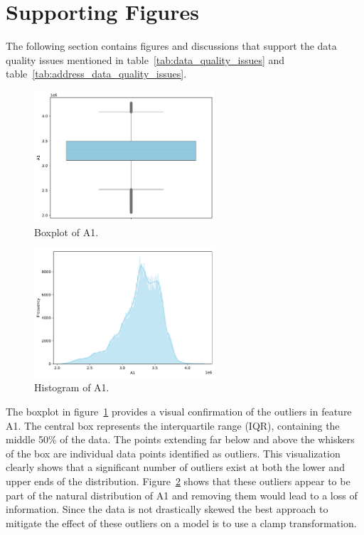 \documentclass[11pt]{report}
\begin{document}
\section*{Supporting Figures}

The following section contains figures and discussions that support the data quality issues mentioned in table~\ref{tab:data_quality_issues} and table~\ref{tab:address_data_quality_issues}.

\begin{figure}[H]
    \centering
    \includegraphics[width=0.6\textwidth]{images/A1_boxplot.pdf}
    \caption{Boxplot of A1.}
    \label{fig:a1_boxplot}
\end{figure}

\begin{figure}[H]
    \centering
    \includegraphics[width=0.6\textwidth]{images/A1_histplot.pdf}
    \caption{Histogram of A1.}
    \label{fig:a1_histplot}
\end{figure}

The boxplot in figure~\ref{fig:a1_boxplot} provides a visual confirmation of the outliers in feature A1. The central box represents the interquartile range (IQR), containing the middle 50\% of the data. The points extending far below and above the whiskers of the box are individual data points identified as outliers. This visualization clearly shows that a significant number of outliers exist at both the lower and upper ends of the distribution. Figure~\ref{fig:a1_histplot} shows that these outliers appear to be part of the natural distribution of A1 and removing them would lead to a loss of information. Since the data is not drastically skewed the best approach to mitigate the effect of these outliers on a model is to use a clamp transformation.
\end{document}
